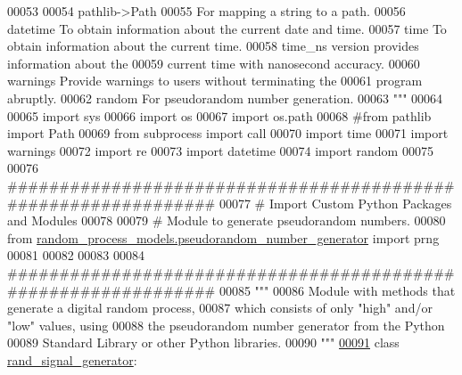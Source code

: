 \begin{DoxyCode}
00053 \textcolor{stringliteral}{}
00054 \textcolor{stringliteral}{    pathlib->Path}
00055 \textcolor{stringliteral}{                For mapping a string to a path.}
00056 \textcolor{stringliteral}{    datetime    To obtain information about the current date and time.}
00057 \textcolor{stringliteral}{    time        To obtain information about the current time.}
00058 \textcolor{stringliteral}{                time\_ns version provides information about the}
00059 \textcolor{stringliteral}{                    current time with nanosecond accuracy.}
00060 \textcolor{stringliteral}{    warnings    Provide warnings to users without terminating the}
00061 \textcolor{stringliteral}{                    program abruptly.}
00062 \textcolor{stringliteral}{    random      For pseudorandom number generation.}
00063 \textcolor{stringliteral}{"""}
00064 
00065 \textcolor{keyword}{import} sys
00066 \textcolor{keyword}{import} os
00067 \textcolor{keyword}{import} os.path
00068 \textcolor{comment}{#from pathlib import Path}
00069 \textcolor{keyword}{from} subprocess \textcolor{keyword}{import} call
00070 \textcolor{keyword}{import} time
00071 \textcolor{keyword}{import} warnings
00072 \textcolor{keyword}{import} re
00073 \textcolor{keyword}{import} datetime
00074 \textcolor{keyword}{import} random
00075 
00076 \textcolor{comment}{###############################################################}
00077 \textcolor{comment}{#   Import Custom Python Packages and Modules}
00078 
00079 \textcolor{comment}{# Module to generate pseudorandom numbers.}
00080 \textcolor{keyword}{from} \hyperlink{namespacerandom__process__models_1_1pseudorandom__number__generator}{random\_process\_models.pseudorandom\_number\_generator}
       \textcolor{keyword}{import} prng
00081 
00082 
00083 
00084 \textcolor{comment}{###############################################################}
00085 \textcolor{stringliteral}{"""}
00086 \textcolor{stringliteral}{    Module with methods that generate a digital random process,}
00087 \textcolor{stringliteral}{        which consists of only "high" and/or "low" values, using}
00088 \textcolor{stringliteral}{        the pseudorandom number generator from the Python}
00089 \textcolor{stringliteral}{        Standard Library or other Python libraries.}
00090 \textcolor{stringliteral}{"""}
\hypertarget{random__process__generator_8py_source_l00091}{}\hyperlink{classrandom__process__models_1_1random__process__generator_1_1rand__signal__generator}{00091} \textcolor{keyword}{class }\hyperlink{classrandom__process__models_1_1random__process__generator_1_1rand__signal__generator}{rand\_signal\_generator}:

\end{DoxyCode}
